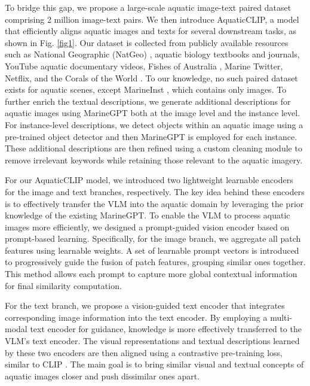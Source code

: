 To bridge this gap, we propose a large-scale aquatic image-text paired dataset comprising 2 million image-text pairs. 
We then introduce AquaticCLIP, a model that efficiently aligns aquatic images and texts for several downstream tasks, as shown in Fig. \ref{fig1}.
Our dataset is collected from publicly available resources such as National Geographic (NatGeo) \cite{doe2023coral, national_geographic_coral, ng_coral_bleaching, ng_ocean_acidification,ng_great_barrier_reef,ng_coral_conservation,ng_ocean_biodiversity}, aquatic biology textbooks and journals, YouTube aquatic documentary videos, Fishes of Australia \cite{van2014family, schodde1997zoological, merrick2006australasian,shelley2017revision}, Marine Twitter, Netflix, and the Corals of the World \cite{veron2016corals}.
To our knowledge, no such paired dataset exists for aquatic scenes, except MarineInst \cite{ziqiang2024marineinst}, which contains only images. 
To further enrich the textual descriptions, we  generate additional descriptions for aquatic images using MarineGPT \cite{zheng2023marinegpt} both at the image level and the instance level. 
For instance-level descriptions, we detect objects within an aquatic image using a pre-trained object detector and then MarineGPT is employed for each instance.
These additional descriptions are then refined using a custom cleaning module to remove irrelevant keywords while retaining those relevant to the aquatic imagery.

For our AquaticCLIP model, we introduced two lightweight learnable encoders for the image and text branches, respectively. 
The key idea behind these encoders is to effectively transfer the VLM into the aquatic domain by leveraging the prior knowledge of the existing MarineGPT. 
To enable the VLM to process aquatic images more efficiently, we designed a prompt-guided vision encoder based on prompt-based learning. 
Specifically, for the image branch, we aggregate all patch features using learnable weights. 
A set of learnable prompt vectors is introduced to progressively guide the fusion of patch features, grouping similar ones together. 
This method allows each prompt to capture more global contextual information for final similarity computation.

For the text branch, we propose a vision-guided text encoder that integrates corresponding image information into the text encoder. 
By employing a multi-modal text encoder for guidance, knowledge is more effectively transferred to the VLM's text encoder. 
The visual representations and textual descriptions learned by these two encoders are then aligned using a contrastive pre-training loss, similar to CLIP \cite{radford2021learning}.
The main goal is to bring similar visual and textual concepts of aquatic images closer and push dissimilar ones apart.


